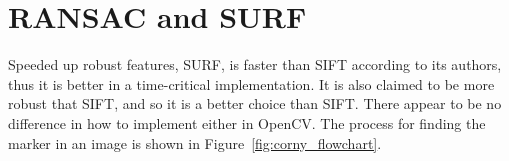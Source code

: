 \section{RANSAC and \textsc{SURF}}

Speeded up robust features, \textsc{SURF}, is faster than \textsc{SIFT} according to its authors, thus it is better in a time-critical implementation.
It is also claimed to be more robust that \textsc{SIFT}, and so it is a better choice than SIFT.\@
There appear to be no difference in how to implement either in OpenCV.\@
The process for finding the marker in an image is shown in Figure~\vref{fig:corny_flowchart}.
